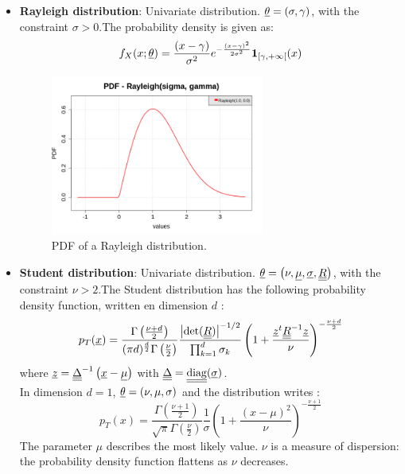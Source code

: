 {\begin{itemize}
\item {\bf Rayleigh distribution}:   Univariate distribution. ${\underline{\theta}} = \left( \sigma, \gamma \right)$, with the constraint  $\sigma>0$.The probability density is given as:
\begin{equation}
f_X(x;{\underline{\theta}}) = \displaystyle \frac{(x - \gamma)}{\sigma^2}e^{-\frac{(x-\gamma)^2}{2\sigma^2}}\boldsymbol{1}_{[\gamma,+\infty[}(x)
\end{equation}

\begin{figure}[H]
\begin{center}
\includegraphics[width=7cm]{Figures/pdf_Rayleigh.png}
\caption{PDF of a Rayleigh distribution.}
\end{center}
\end{figure}






\item {\bf Student distribution}:  Univariate distribution. ${\underline{\theta}} = \left( \nu,{\underline{\mu}}, {\underline{\sigma}}, {\underline{\underline{R}}}\right)$, with the constraint $\nu > 2$.The Student distribution has the following  probability density function, written en dimension $d$ :
\begin{equation}
p_T({\underline{x}}) = \frac{\Gamma\left(\frac{\nu+d}{2}\right)}
{(\pi d)^{\frac{d}{2}}\Gamma\left(\frac{\nu}{2}\right)}\frac{\left|\mathrm{det}({\underline{\underline{R}}})\right|^{-1/2}}{\prod_{k=1}^d\sigma_k}\left(1+\frac{{\underline{z}}^t{\underline{\underline{R}}}^{-1}{\underline{z}}}{\nu}\right)^{-\frac{\nu+d}{2}}
\end{equation}
where ${\underline{z}}={\underline{\underline{\Delta}}}^{-1}\left({\underline{x}}-{\underline{\mu}}\right)$ with ${\underline{\underline{\Delta}}}={\underline{\underline{\mathrm{diag}}}}({\underline{\sigma}})$.\\

In dimension $d=1$, ${\underline{\theta}} = (\nu, \mu, \sigma)$ and the distribution writes :
\begin{equation}
\displaystyle p_T(x) = \frac{\Gamma\left(\frac{\nu+1}{2}\right)}
{\sqrt{\pi}\Gamma\left(\frac{\nu}{2}\right)}\frac{1}{\sigma}\left(1+\frac{(x-\mu)^2}{\nu}\right)^{-\frac{\nu+1}{2}}
\end{equation}
The parameter $\mu$ describes the most likely value. $\nu$ is a measure of dispersion: the probability density function flattens as $\nu$ decreases.


\end{itemize}}
